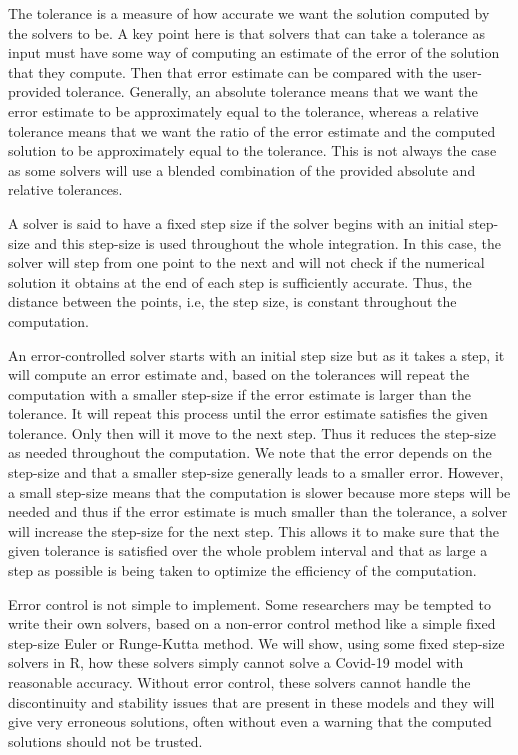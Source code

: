 The tolerance is a measure of how accurate we want the solution computed by the solvers to be. A key point here is that solvers that can take a tolerance as input must have some way of computing an estimate of the error of the solution that they compute. Then that error estimate can be compared with the user-provided tolerance. Generally, an absolute tolerance means that we want the error estimate to be approximately equal to the tolerance, whereas a relative tolerance means that we want the ratio of the error estimate and the computed solution to be approximately equal to the tolerance. This is not always the case as some solvers will use a blended combination of the provided absolute and relative tolerances.

A solver is said to have a fixed step size if the solver begins with an initial step-size and this step-size is used throughout the whole integration. In this case, the solver will step from one point to the next and will not check if the numerical solution it obtains at the end of each step is sufficiently accurate. Thus, the distance between the points, i.e, the step size, is constant throughout the computation.

An error-controlled solver starts with an initial step size but as it takes a step, it will compute an error estimate and, based on the tolerances will repeat the computation with a smaller step-size if the error estimate is larger than the tolerance. It will repeat this process until the error estimate satisfies the given tolerance. Only then will it move to the next step. Thus it reduces the step-size as needed throughout the computation. We note that the error depends on the step-size and that a smaller step-size generally leads to a smaller error. However, a small step-size means that the computation is slower because more steps will be needed and thus if the error estimate is much smaller than the tolerance, a solver will increase the step-size for the next step. This allows it to make sure that the given tolerance is satisfied over the whole problem interval and that as large a step as possible is being taken to optimize the efficiency of the computation.

Error control is not simple to implement. Some researchers may be tempted to write their own solvers, based on a non-error control method like a simple fixed step-size Euler or Runge-Kutta method. We will show, using some fixed step-size solvers in R, how these solvers simply cannot solve a Covid-19 model with reasonable accuracy. Without error control, these solvers cannot handle the discontinuity and stability issues that are present in these models and they will give very erroneous solutions, often without even a warning that the computed solutions should not be trusted.

